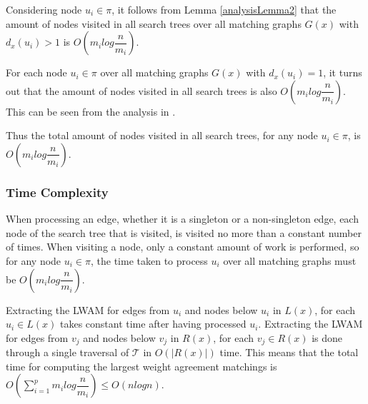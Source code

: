 Considering node $u_i \in \pi$, it follows from Lemma \ref{analysisLemma2} that the amount of nodes visited in all search trees over all matching graphs $G(x)$ with $d_x(u_i) > 1$ is $O(m_ilog\dfrac{n}{m_i})$.

For each node $u_i \in \pi$ over all matching graphs $G(x)$ with $d_x(u_i) = 1$, it turns out that the amount of nodes visited in all search trees is also $O(m_ilog\dfrac{n}{m_i})$. This can be seen from the analysis in \cite{nlogn}.

Thus the total amount of nodes visited in all search trees, for any node $u_i \in \pi$, is $O(m_ilog\dfrac{n}{m_i})$.

\subsubsection{Time Complexity}
When processing an edge, whether it is a singleton or a non-singleton edge, each node of the search tree that is visited, is visited no more than a constant number of times. When visiting a node, only a constant amount of work is performed, so for any node $u_i \in \pi$, the time taken to process $u_i$ over all matching graphs must be $O(m_ilog\dfrac{n}{m_i})$.

Extracting the LWAM for edges from $u_i$ and nodes below $u_i$ in $L(x)$, for each $u_i \in L(x)$ takes constant time after having processed $u_i$. Extracting the LWAM for edges from $v_j$ and nodes below $v_j$ in $R(x)$, for each $v_j \in R(x)$ is done through a single traversal of $\mathcal{T}$ in $O(|R(x)|)$ time. This means that the total time for computing the largest weight agreement matchings is $O(\sum_{i=1}^p m_ilog\dfrac{n}{m_i}) \le O(nlogn)$.